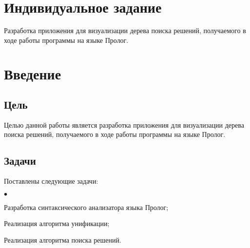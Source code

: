 \chapter{Индивидуальное задание}
Разработка приложения для визуализации дерева поиска решений, получаемого в ходе работы программы на языке Пролог.


\chapter{Введение}
\section{Цель}
Целью данной работы является разработка приложения для визуализации дерева поиска решений, получаемого в ходе работы программы на языке Пролог.
\section{Задачи}
Поставлены следующие задачи:
\begin{list}{$\bullet$}{}
	\item Разработка синтаксического анализатора языка Пролог;
	\item Реализация алгоритма унификации;
	\item Реализация алгоритма поиска решений.
\end{list}
